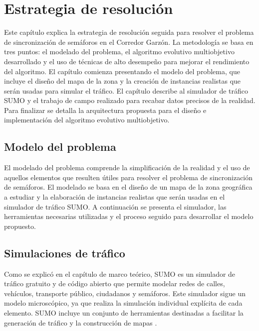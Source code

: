 \chapter{Estrategia de resolución}

Este capítulo explica la estrategia de resolución seguida para resolver el problema de sincronización de semáforos en el Corredor Garzón. La metodología se basa en tres puntos: el modelado del problema, el algoritmo evolutivo multiobjetivo desarrollado y el uso de técnicas de alto desempeño para mejorar el rendimiento del algoritmo. El capítulo comienza presentando el modelo del problema, que incluye el diseño del mapa de la zona y la creación de instancias realistas que serán usadas para simular el tráfico. El capítulo describe al simulador de tráfico SUMO y el trabajo de campo realizado para recabar datos precisos de la realidad. Para finalizar se detalla la arquitectura propuesta para el diseño e implementación del algoritmo evolutivo multiobjetivo.



\section{Modelo del problema }

El modelado del problema comprende la simplificación de la realidad y el uso de aquellos elementos que resulten útiles para resolver el problema de sincronización de semáforos. El modelado se basa en el diseño de un mapa de la zona geográfica a estudiar y la elaboración de instancias realistas que serán usadas en el simulador de tráfico SUMO. A continuación se presenta el simulador, las herramientas necesarias utilizadas y el proceso seguido para desarrollar el modelo propuesto. 

\section{Simulaciones de tráfico}

Como se explicó en el capítulo de marco teórico, SUMO es un simulador de tráfico gratuito y de código abierto que permite modelar redes de calles, vehículos, transporte público, ciudadanos y semáforos. Este simulador sigue un modelo microscópico, ya que realiza la simulación individual explícita de cada elemento. SUMO incluye un conjunto de herramientas destinadas a facilitar la generación de tráfico y la construcción de mapas \citep{SumoTools}. 

